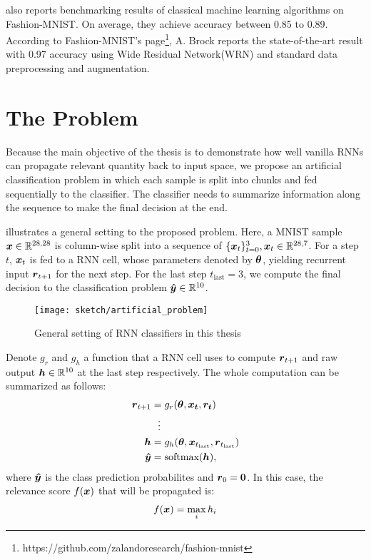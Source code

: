 \cite{XiaoFashionMNISTNovelImage2017} also reports benchmarking results of classical machine learning algorithms on Fashion-MNIST. On average, they achieve accuracy between 0.85 to 0.89. According to Fashion-MNIST's page\footnote{https://github.com/zalandoresearch/fashion-mnist}, A. Brock reports the state-of-the-art result  with 0.97 accuracy using Wide Residual Network(WRN)\cite{ZagoruykoWideResidualNetworks2016} and standard data preprocessing and augmentation.

\section{The Problem}
 Because the main objective of the thesis is to demonstrate how well vanilla RNNs can propagate relevant quantity back to input space, we propose an artificial classification problem in which each sample is split into chunks and fed sequentially to the classifier. The classifier needs to summarize information along the sequence to make the final decision at the end. 
 
 \addfigure{\ref{fig:artificial_problem}} illustrates a general setting to the proposed problem. Here, a MNIST sample $ \patvector{x} \in \mathbb{R}^{28,28}$ is column-wise split into a sequence of $\{ \patvector{x}_t \}_{t=0} ^ 3, \patvector{x}_t \in   \mathbb{R}^{28,7}$. For a step $t$, $\patvector{x}_t$ is fed to a RNN cell, whose parameters denoted by $\patvector{\theta}$, yielding recurrent input $\patvector{r}_{t+1}$ for the next step. For the last step $t_{\text{last}} = 3$, we compute the final decision to the classification problem $\patvector{\hat{y}} \in \mathbb{R}^{10}$. 
 \begin{figure}[!hbt]
\centering
\texttt{[image: sketch/artificial\_problem]}
\caption{General setting of RNN classifiers in this thesis} 
\label{fig:artificial_problem}
\end{figure}

 Denote $g_r$ and $g_{h}$ a function that a RNN cell uses to compute $\patvector{r}_{t+1}$ and raw output $\patvector{h} \in \mathbb{R}^{10}$ at the last step respectively. The whole computation can be summarized as follows: 
 \begin{align*}
 	\patvector{r}_{t+1} &= g_r(\patvector{\theta}, \patvector{x_t}, \patvector{r_t}) \\
 	 &\ \ \vdots\\
 	 \patvector{h} &= g_{h}(\patvector{\theta}, \patvector{x}_{t_{\text{last}}},  \patvector{r}_{t_{\text{last}}}) \\
 	\patvector{\hat{y}} &= \text{softmax}(\patvector{h}),
 \end{align*}
 where $\patvector{\hat{y}}$ is the class prediction probabilites and $\patvector{r}_0 = \patvector{0}$. In this case, the relevance score $f(\patvector{x})$ that will be propagated is:
 \begin{align*}
 	f(\patvector{x}) = \max_i h_i
 \end{align*}
 
